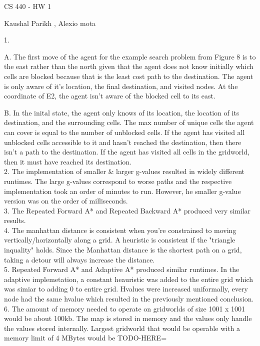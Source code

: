 \documentclass{article}
\begin{document}
\centerline{\sc \large CS 440 - HW 1}
\vspace{.5pc}
\centerline{\sc Kaushal Parikh , Alexio mota}
\vspace{2pc}

1.

\setlength\parindent{3pc}  A. The first move of the agent for the example search problem from Figure 8 is to the east rather than the north given that the agent does not know initially which cells are blocked because that is the least cost path to the destination. The agent is only aware of it's location, the final destination, and visited nodes. At the coordinate of E2, the agent isn't aware of the blocked cell to its east. 

\setlength\parindent{3pc}  B.  In the inital state, the agent only knows of its location, the location of its destination, and the surrounding cells. The max number of unique cells the agent can cover is equal to the number of unblocked cells. If the agent has visited all unblocked cells accessible to it and hasn't reached the destination, then there isn't a path to the destination. If the agent has visited all cells in the gridworld, then it must have reached its destination.
\vspace{2pc}
\\
2. \setlength\parindent{3pc} The implementation of smaller \& larger g-values resulted in widely different runtimes. The large g-values correspond to worse paths and the respective implementation took an order of minutes to run. However, he smaller g-value version was on the order of milliseconds.
\vspace{2pc}
\\
3. \setlength\parindent{3pc}  The Repeated Forward A* and Repeated Backward A* produced very similar results.
\vspace{2pc}
\\
4. \setlength\parindent{3pc} The manhattan distance is consistent when you're constrained to moving vertically/horizontally along a grid. A heuristic is consistent if the "triangle inquality" holds. Since the Manhattan distance is the shortest path on a grid, taking a detour will always increase the distance.
\vspace{2pc}
\\
5. \setlength\parindent{3pc}  Repeated Forward A* and Adaptive A* produced similar runtimes. In the adaptive implemetation, a constant heauristic was added to the entire grid which was simiar to adding 0 to entire grid. Hvalues were increased uniformally, every node had the same hvalue which resulted in the previously mentioned conclusion.
\vspace{2pc}
\\
6. \setlength\parindent{3pc} The amount of memory needed to operate on gridworlds of size 1001 x 1001 would be about 100kb. The map is stored in memory and the values only handle the values stored internally. Largest gridworld that would be operable with a memory limit of 4 MBytes would be TODO-HERE=
\vspace{2pc}
\\

\setlength\parindent{3pc}
\end{document}
